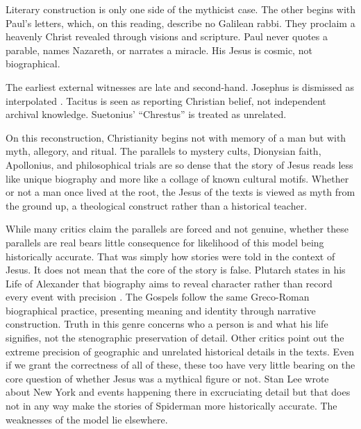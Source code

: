 Literary construction is only one side of the mythicist case.
The other begins with Paul's letters, which, on this reading, describe no Galilean rabbi.
They proclaim a heavenly Christ revealed through visions and scripture.
Paul never quotes a parable, names Nazareth, or narrates a miracle.
His Jesus is cosmic, not biographical.

The earliest external witnesses are late and second-hand.
Josephus is dismissed as interpolated \cite[18.63--64]{josephus:ant}.
Tacitus is seen as reporting Christian belief, not independent archival knowledge.
Suetonius’ “Chrestus” is treated as unrelated.

On this reconstruction, Christianity begins not with memory of a man but with myth, allegory, and ritual.
The parallels to mystery cults, Dionysian faith, Apollonius, and philosophical trials are so dense that the story of Jesus reads less like unique biography and more like a collage of known cultural motifs.
Whether or not a man once lived at the root, the Jesus of the texts is viewed as myth from the ground up, a theological construct rather than a historical teacher.

While many critics claim the parallels are forced and not genuine, whether these parallels are real bears little consequence for likelihood of this model being historically accurate.
That was simply how stories were told in the context of Jesus.
It does not mean that the core of the story is false.
Plutarch states in his Life of Alexander that biography aims to reveal character rather than record every event with precision \cite[Alexander 1.2]{plutarch:lives}.
The Gospels follow the same Greco-Roman biographical practice, presenting meaning and identity through narrative construction.
Truth in this genre concerns who a person is and what his life signifies, not the stenographic preservation of detail.
Other critics point out the extreme precision of geographic and unrelated historical details in the texts.
Even if we grant the correctness of all of these, these too have very little bearing on the core question of whether Jesus was a mythical figure or not.
Stan Lee wrote about New York and events happening there in excruciating detail but that does not in any way make the stories of Spiderman more historically accurate.
The weaknesses of the model lie elsewhere.

